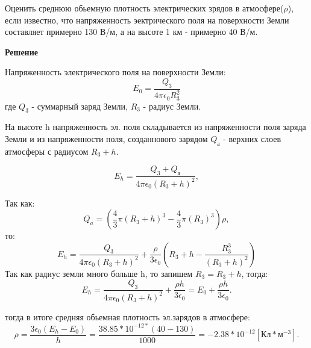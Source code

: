 \documentclass[__main__.tex]{subfiles}
\begin{document}
Оценить среднюю обьемную плотность электрических зрядов в атмосфере($\rho$), если известно, что напряженность эектрического поля на поверхности Земли составляет примерно 130 В/м, а на высоте 1 км - примерно 40 В/м.

\textbf{Решение}

Напряженность электрического поля на поверхности Земли:
\begin{equation}
\label{Э-20\1}
E_{0}=\frac{Q_{3}}{4\pi \epsilon_{0} R^2_{3}}
\end{equation}
 где $Q_{3}$ - суммарный заряд Земли, $R_{3}$ - радиус Земли. 
 
 На высоте h напряженность эл. поля складывается из напряженности поля заряда Земли и из напряженности поля, созданнового зарядом $Q_{а}$ - верхних слоев атмосферы с радиусом  $R_{3}+h$.
 
 \begin{equation}
 \label{Э-20\2}
 E_{h}=\frac{Q_{3}+Q_{а}}{4\pi \epsilon_{0} (R_{3}+h)^{2}},
 \end{equation}
 
 Так как:
  \begin{equation}
 \label{Э-20\3}
 Q_{a}=(\frac{4}{3}\pi (R_{3}+h)^{3}-\frac{4}{3}\pi (R_{3})^{3})\rho,
 \end{equation}
 то:
  \begin{equation}
 \label{Э-20\4}
 E_{h}=\frac{Q_{3}}{4\pi \epsilon_{0} (R_{3}+h)^{2}}+\frac{\rho}{3\epsilon_{0}}(R_{3}+h-\frac{R_{3}^{3}}{(R_{3}+h)^{2}})
 \end{equation}
 Так как радиус земли много больше h, то запишем $R_{3}=R_{3}+h$, тогда:
  \begin{equation}
 \label{Э-20\5}
 E_{h}=\frac{Q_{3}}{4\pi \epsilon_{0} (R_{3}+h)^{2}}+\frac{\rho h}{3\epsilon_{0}}=E_{0}+\frac{\rho h}{3\epsilon_{0}}.
 \end{equation}
 
 тогда в итоге средняя обьемная плотность эл.зарядов в атмосфере:
  \begin{equation}
 \label{Э-20\6}
\rho=\frac{3\epsilon_{0}(E_{h}-E_{0})}{h}=\frac{3 8.85*10^{-12*}(40-130)}{1000}=-2.38*10^{-12} [Кл * м^{-3}].
 \end{equation}
 
\end{document}
